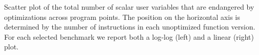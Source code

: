 \label{fig:CS-debug-tot-dead} Scatter plot of the total number of scalar user variables that are endangered by optimizations across program points. The position on the horizontal axis is determined by the number of instructions in each unoptimized function version. For each selected benchmark we report both a log-log (left) and a linear (right) plot.